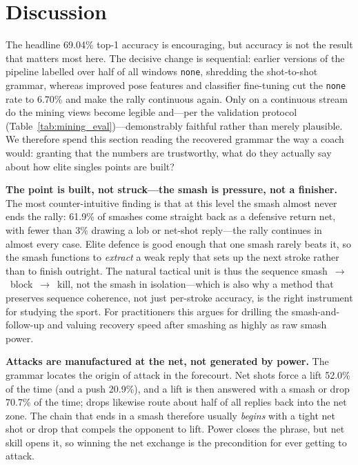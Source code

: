 \section{Discussion}

The headline 69.04\% top-1 accuracy is encouraging, but accuracy is not the
result that matters most here. The decisive change is sequential: earlier
versions of the pipeline labelled over half of all windows \texttt{none},
shredding the shot-to-shot grammar, whereas improved pose features and
classifier fine-tuning cut the \texttt{none} rate to 6.70\% and make the rally
continuous again. Only on a continuous stream do the mining views become
legible and---per the validation protocol
(Table~\ref{tab:mining_eval})---demonstrably faithful rather than merely
plausible. We therefore spend this
section reading the recovered grammar the way a coach would: granting that the
numbers are trustworthy, what do they actually say about how elite singles
points are built?

\textbf{The point is built, not struck---the smash is pressure, not a finisher.}
The most counter-intuitive finding is that at this level the smash almost never
ends the rally: 61.9\% of smashes come straight back as a defensive return net,
with fewer than 3\% drawing a lob or net-shot reply---the rally continues in
almost every case. Elite
defence is good enough that one smash rarely beats it, so the smash functions to
\emph{extract} a weak reply that sets up the next stroke rather than to finish
outright. The natural tactical unit is thus the sequence
smash~$\rightarrow$~block~$\rightarrow$~kill, not the smash in isolation---which
is also why a method that preserves sequence coherence, not just per-stroke
accuracy, is the right instrument for studying the sport. For practitioners this
argues for drilling the smash-and-follow-up and valuing recovery speed after
smashing as highly as raw smash power.

\textbf{Attacks are manufactured at the net, not generated by power.}
The grammar locates the origin of attack in the forecourt. Net shots force a
lift 52.0\% of the time (and a push 20.9\%), and a lift is then answered with a
smash or drop 70.7\% of the time; drops likewise route about half of all replies
back into the net zone. The chain that ends in a smash therefore usually
\emph{begins} with a tight net shot or drop that compels the opponent to lift.
Power closes the phrase, but net skill opens it, so winning the net exchange is
the precondition for ever getting to attack.

